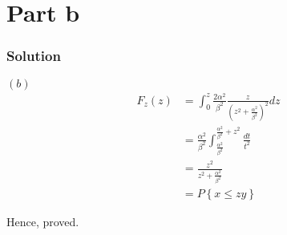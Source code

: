 \documentclass{beamer}
\providecommand{\cbrak}[1]{\ensuremath{\left\{#1\right\}}}
\providecommand{\brak}[1]{\ensuremath{\left(#1\right)}}
\begin{document}
\section{Part b}
\begin{frame}
\frametitle{Solution}
\brak{b}
\begin{align}
    F_{z}\brak{z} &= \int_{0}^z \frac{2\alpha^{2}}{\beta^{2}}\frac{z}{{\brak{z^{2} + \frac{\alpha^{2}}{\beta^{2}}}}^2}dz\\
    &= \frac{\alpha^{2}}{\beta^{2}} \int_{\frac{\alpha^{2}}{\beta^{2}}}^{\frac{\alpha^{2}}{\beta^{2}} + z^{2}}\frac{dt}{t^{2}}\\
    &= \frac{z^{2}}{z^{2} + \frac{\alpha^{2}}{\beta^{2}}}\\
    &= P\cbrak{x \leq zy}
\end{align}

Hence, proved.
\end{frame}
\end{document}
